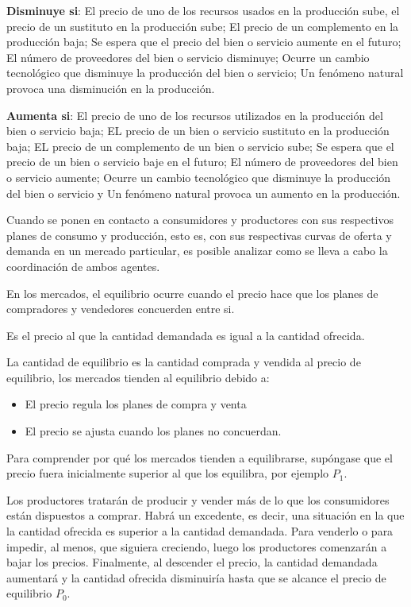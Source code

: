 \textbf{Disminuye si}: El precio de uno de los recursos usados en la producción sube, el precio de un sustituto en la producción sube; El precio de un complemento en la producción baja; Se espera que el precio del bien o servicio aumente en el futuro; El número de proveedores del bien o servicio disminuye; Ocurre un cambio tecnológico que disminuye la producción del bien o servicio; Un fenómeno natural provoca una disminución en la producción.

\textbf{Aumenta si}: El precio de uno de los recursos utilizados en la producción del bien o servicio baja; EL precio de un bien o servicio sustituto en la producción baja; EL precio de un complemento de un bien o servicio sube; Se espera que el precio de un bien o servicio baje en el futuro; El número de proveedores del bien o servicio aumente; Ocurre un cambio tecnológico que disminuye la producción del bien o servicio y Un fenómeno natural provoca un aumento en la producción.

Cuando se ponen en contacto a consumidores y productores con sus respectivos planes de consumo y producción, esto es, con sus respectivas curvas de oferta y demanda en un mercado particular, es posible analizar como se lleva a cabo la coordinación de ambos agentes.

En los mercados, el equilibrio ocurre cuando el precio hace que los planes de compradores y vendedores concuerden entre si.
\begin{definition}
    Es el precio al que la cantidad demandada es igual a la cantidad ofrecida.
\end{definition} 
La cantidad de equilibrio es la cantidad comprada y vendida al precio de equilibrio, los mercados tienden al equilibrio debido a:
\begin{itemize}
    \item El precio regula los planes de compra y venta
    \item El precio se ajusta cuando los planes no concuerdan.
\end{itemize}
Para comprender por qué los mercados tienden a equilibrarse, supóngase que el precio fuera inicialmente superior al que los equilibra, por ejemplo $P_1$.

Los productores tratarán de producir y vender más de lo que los consumidores están dispuestos a comprar. Habrá un excedente, es decir, una situación en la que la cantidad ofrecida es superior a la cantidad demandada. Para venderlo o para impedir, al menos, que siguiera creciendo, luego los productores comenzarán a bajar los precios. Finalmente, al descender el precio, la cantidad demandada aumentará y la cantidad ofrecida disminuiría hasta que se alcance el precio de equilibrio $P_0$.

